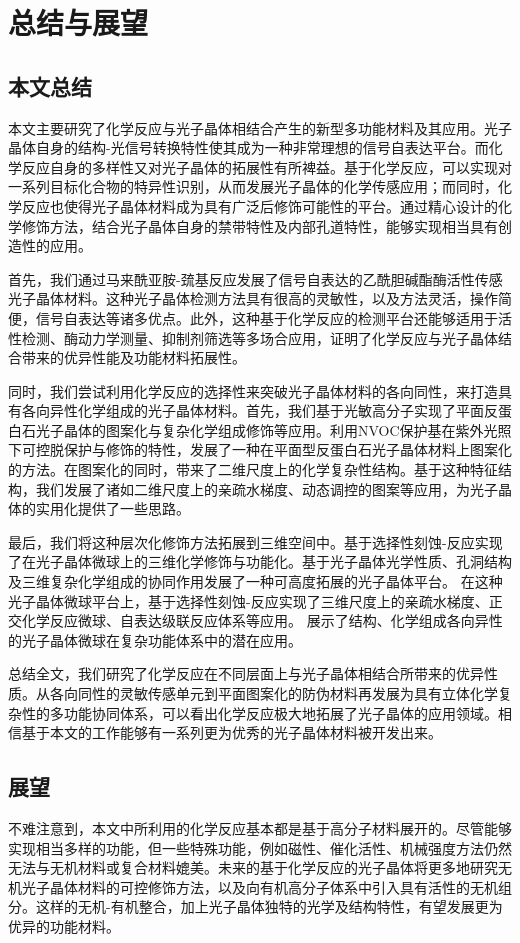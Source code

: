 
\chapter{总结与展望}
\label{ch:conclusion}

\section{本文总结}

本文主要研究了化学反应与光子晶体相结合产生的新型多功能材料及其应用。光子晶体自身的结构-光信号转换特性使其成为一种非常理想的信号自表达平台。而化学反应自身的多样性又对光子晶体的拓展性有所裨益。基于化学反应，可以实现对一系列目标化合物的特异性识别，从而发展光子晶体的化学传感应用；而同时，化学反应也使得光子晶体材料成为具有广泛后修饰可能性的平台。通过精心设计的化学修饰方法，结合光子晶体自身的禁带特性及内部孔道特性，能够实现相当具有创造性的应用。

首先，我们通过马来酰亚胺-巯基反应发展了信号自表达的乙酰胆碱酯酶活性传感光子晶体材料。这种光子晶体检测方法具有很高的灵敏性，以及方法灵活，操作简便，信号自表达等诸多优点。此外，这种基于化学反应的检测平台还能够适用于活性检测、酶动力学测量、抑制剂筛选等多场合应用，证明了化学反应与光子晶体结合带来的优异性能及功能材料拓展性。

同时，我们尝试利用化学反应的选择性来突破光子晶体材料的各向同性，来打造具有各向异性化学组成的光子晶体材料。首先，我们基于光敏高分子实现了平面反蛋白石光子晶体的图案化与复杂化学组成修饰等应用。利用NVOC保护基在紫外光照下可控脱保护与修饰的特性，发展了一种在平面型反蛋白石光子晶体材料上图案化的方法。在图案化的同时，带来了二维尺度上的化学复杂性结构。基于这种特征结构，我们发展了诸如二维尺度上的亲疏水梯度、动态调控的图案等应用，为光子晶体的实用化提供了一些思路。

最后，我们将这种层次化修饰方法拓展到三维空间中。基于选择性刻蚀-反应实现了在光子晶体微球上的三维化学修饰与功能化。基于光子晶体光学性质、孔洞结构及三维复杂化学组成的协同作用发展了一种可高度拓展的光子晶体平台。
在这种光子晶体微球平台上，基于选择性刻蚀-反应实现了三维尺度上的亲疏水梯度、正交化学反应微球、自表达级联反应体系等应用。
展示了结构、化学组成各向异性的光子晶体微球在复杂功能体系中的潜在应用。

总结全文，我们研究了化学反应在不同层面上与光子晶体相结合所带来的优异性质。从各向同性的灵敏传感单元到平面图案化的防伪材料再发展为具有立体化学复杂性的多功能协同体系，可以看出化学反应极大地拓展了光子晶体的应用领域。相信基于本文的工作能够有一系列更为优秀的光子晶体材料被开发出来。

\section{展望}

不难注意到，本文中所利用的化学反应基本都是基于高分子材料展开的。尽管能够实现相当多样的功能，但一些特殊功能，例如磁性、催化活性、机械强度方法仍然无法与无机材料或复合材料媲美。未来的基于化学反应的光子晶体将更多地研究无机光子晶体材料的可控修饰方法，以及向有机高分子体系中引入具有活性的无机组分。这样的无机-有机整合，加上光子晶体独特的光学及结构特性，有望发展更为优异的功能材料。